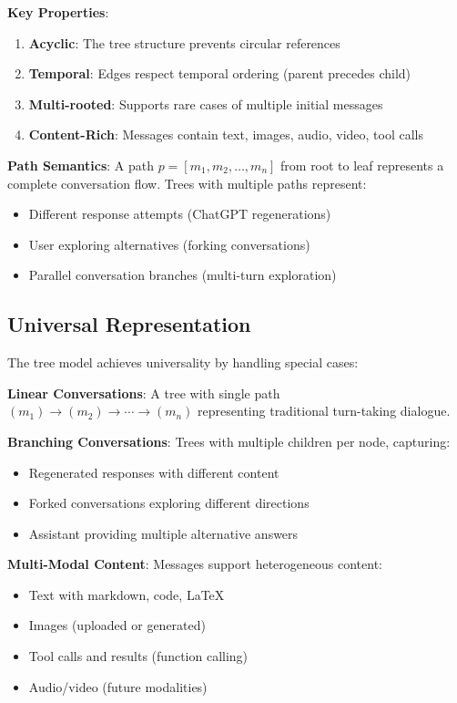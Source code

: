\documentclass[11pt,letterpaper]{article}
\begin{document}
\textbf{Key Properties}:

\begin{enumerate}
    \item \textbf{Acyclic}: The tree structure prevents circular references
    \item \textbf{Temporal}: Edges respect temporal ordering (parent precedes child)
    \item \textbf{Multi-rooted}: Supports rare cases of multiple initial messages
    \item \textbf{Content-Rich}: Messages contain text, images, audio, video, tool calls
\end{enumerate}

\textbf{Path Semantics}: A path $p = [m_1, m_2, \ldots, m_n]$ from root to leaf represents a complete conversation flow. Trees with multiple paths represent:

\begin{itemize}
    \item Different response attempts (ChatGPT regenerations)
    \item User exploring alternatives (forking conversations)
    \item Parallel conversation branches (multi-turn exploration)
\end{itemize}

\subsection{Universal Representation}

The tree model achieves universality by handling special cases:

\textbf{Linear Conversations}: A tree with single path $(m_1) \rightarrow (m_2) \rightarrow \cdots \rightarrow (m_n)$ representing traditional turn-taking dialogue.

\textbf{Branching Conversations}: Trees with multiple children per node, capturing:
\begin{itemize}
    \item Regenerated responses with different content
    \item Forked conversations exploring different directions
    \item Assistant providing multiple alternative answers
\end{itemize}

\textbf{Multi-Modal Content}: Messages support heterogeneous content:
\begin{itemize}
    \item Text with markdown, code, LaTeX
    \item Images (uploaded or generated)
    \item Tool calls and results (function calling)
    \item Audio/video (future modalities)
\end{itemize}
\end{document}
